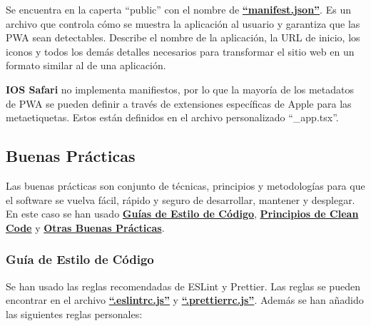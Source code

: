 \documentclass[12pt,twoside,titlepage]{report}
\begin{document}
Se encuentra en la caperta ``public'' con el nombre de \href{https://github.com/alberttogoca/EarFit/blob/main/public/manifest.json}{\textbf{``manifest.json''}}. Es un archivo que controla cómo se muestra la aplicación al usuario y garantiza que las PWA sean detectables. Describe el nombre de la aplicación, la URL de inicio, los iconos y todos los demás detalles necesarios para transformar el sitio web en un formato similar al de una aplicación. 
\cite{manifest}

\textbf{IOS Safari} no implementa manifiestos, por lo que la mayoría de los metadatos de PWA se pueden definir a través de extensiones específicas de Apple para las metaetiquetas. Estos están definidos en el archivo personalizado ``\_app.tsx''.



\subsection{Buenas Prácticas}

Las buenas prácticas son conjunto de técnicas, principios y metodologías para que el software se vuelva fácil, rápido y seguro de desarrollar, mantener y desplegar.
En este caso se han usado \hyperref[sec:estiloCodigo]{\textbf{Guías de Estilo de Código}}, \hyperref[sec:principioscleancode]{\textbf{Principios de Clean Code}} y \hyperref[sec:otrasPracticas]{\textbf{Otras Buenas Prácticas}}.

\subsubsection{Guía de Estilo de Código}
\label{sec:estiloCodigo}

Se han usado las reglas recomendadas de ESLint y Prettier. Las reglas se pueden encontrar en el archivo \href{https://github.com/alberttogoca/EarFit/blob/main/.eslintrc.js}{\textbf{``.eslintrc.js''}} y \href{https://github.com/alberttogoca/EarFit/blob/main/.prettierrc.js}{\textbf{``.prettierrc.js''}}. Además se han añadido las siguientes reglas personales:
\end{document}
